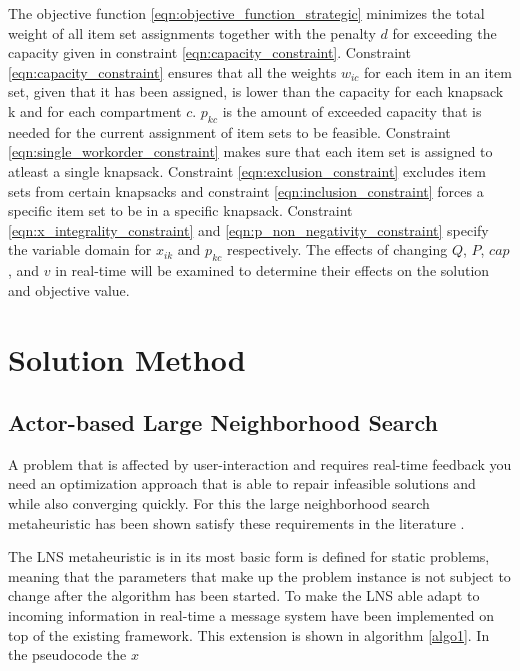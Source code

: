 \documentclass[preprint,12pt,authoryear]{elsarticle}
\begin{document}
The objective function \ref{eqn:objective_function_strategic} minimizes the total weight of all item set assignments together with the penalty $d$ for exceeding the 
capacity given in constraint \ref{eqn:capacity_constraint}. Constraint \ref{eqn:capacity_constraint} ensures that all the weights $w_{ic}$ for each item in an item set, given that it
has been assigned, is lower than the capacity for each knapsack k and for each compartment $c$. $p_{kc}$ is the amount of exceeded capacity that is needed for the current assignment of item sets to be feasible.
Constraint \ref{eqn:single_workorder_constraint} makes sure that each item set is assigned to atleast a single knapsack. Constraint \ref{eqn:exclusion_constraint} excludes item sets from 
certain knapsacks and constraint \ref{eqn:inclusion_constraint}  forces a specific item set to be in a specific knapsack. Constraint \ref{eqn:x_integrality_constraint} and \ref{eqn:p_non_negativity_constraint} 
specify the variable domain for $x_{ik}$ and $p_{kc}$ respectively. The effects of changing $Q$, $P$, $cap$, and $v$ in real-time will be examined to determine their effects on the solution and objective value.

\section{Solution Method}
\label{sec:2-solution-method}

\subsection{Actor-based Large Neighborhood Search}
A problem that is affected by user-interaction and requires real-time feedback you need an optimization approach that is able to repair infeasible solutions and while also 
converging quickly. For this the large neighborhood search metaheuristic has been shown satisfy these requirements in the literature \cite{gendreau_handbook_2019}. 

The LNS metaheuristic is in its most basic form is defined for static problems, meaning that the parameters that make up the problem instance is not subject to change 
after the algorithm has been started. To make the LNS able adapt to incoming information in real-time a message system have been implemented on top of the existing framework. This 
extension is shown in algorithm \ref{algo1}. In the pseudocode the $x$ 
\end{document}
